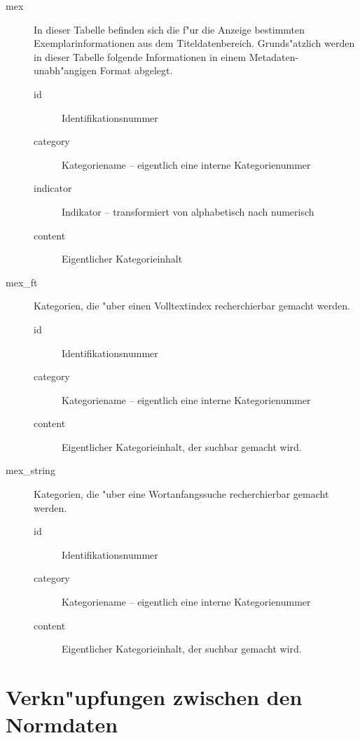 \documentclass[11pt, twoside, a4paper, BCOR8mm, DIV12, bibtotoc,idxtotoc]{scrbook}
\begin{document}
\begin{description}
\item[mex] In dieser Tabelle befinden sich die f"ur die Anzeige
  bestimmten Exemplarinformationen aus dem Titeldatenbereich.
  Grunds"atzlich werden in dieser Tabelle folgende Informationen in
  einem Metadaten-unabh"angigen Format abgelegt.
  \begin{description}
  \item[id] Identifikationsnummer
  \item[category] Kategoriename -- eigentlich eine interne Kategorienummer
  \item[indicator] Indikator -- transformiert von alphabetisch nach numerisch
  \item[content] Eigentlicher Kategorieinhalt
  \end{description}
\item[mex\_ft] Kategorien, die "uber einen Volltextindex recherchierbar
  gemacht werden.
  \begin{description}
  \item[id] Identifikationsnummer
  \item[category] Kategoriename -- eigentlich eine interne Kategorienummer
  \item[content] Eigentlicher Kategorieinhalt, der suchbar gemacht wird.
  \end{description}
\item[mex\_string] Kategorien, die "uber eine Wortanfangssuche
  recherchierbar gemacht werden.
  \begin{description}
  \item[id] Identifikationsnummer
  \item[category] Kategoriename -- eigentlich eine interne Kategorienummer
  \item[content] Eigentlicher Kategorieinhalt, der suchbar gemacht wird.
  \end{description}
\end{description}

\section{Verkn"upfungen zwischen den Normdaten}
\end{document}
